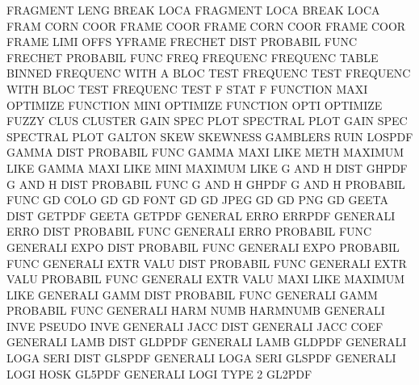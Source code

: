FRAGMENT LENG                           BREAK    LOCA
FRAGMENT LOCA                           BREAK    LOCA
FRAM     CORN COOR                      FRAME    COOR
FRAME    CORN COOR                      FRAME    COOR
FRAME    LIMI OFFS                      YFRAME
FRECHET  DIST                           PROBABIL FUNC
FRECHET                                 PROBABIL FUNC
FREQ                                    FREQUENC
FREQUENC TABLE                          BINNED
FREQUENC WITH A    BLOC TEST            FREQUENC TEST
FREQUENC WITH BLOC TEST                 FREQUENC TEST
F        STAT                           F
FUNCTION MAXI                           OPTIMIZE
FUNCTION MINI                           OPTIMIZE
FUNCTION OPTI                           OPTIMIZE
FUZZY    CLUS                           CLUSTER
GAIN     SPEC PLOT                      SPECTRAL PLOT
GAIN     SPEC                           SPECTRAL PLOT
GALTON   SKEW                           SKEWNESS
GAMBLERS RUIN                           LOSPDF
GAMMA    DIST                           PROBABIL FUNC
GAMMA    MAXI LIKE METH                 MAXIMUM  LIKE
GAMMA    MAXI LIKE MINI                 MAXIMUM  LIKE
G        AND  H    DIST                 GHPDF
G        AND  H    DIST                 PROBABIL FUNC
G        AND  H                         GHPDF
G        AND  H                         PROBABIL FUNC
GD       COLO                           GD
GD       FONT                           GD
GD       JPEG                           GD
GD       PNG                            GD
GEETA    DIST                           GETPDF
GEETA                                   GETPDF
GENERAL  ERRO                           ERRPDF
GENERALI ERRO DIST                      PROBABIL FUNC
GENERALI ERRO                           PROBABIL FUNC
GENERALI EXPO DIST                      PROBABIL FUNC
GENERALI EXPO                           PROBABIL FUNC
GENERALI EXTR VALU DIST                 PROBABIL FUNC
GENERALI EXTR VALU                      PROBABIL FUNC
GENERALI EXTR VALU MAXI LIKE            MAXIMUM  LIKE
GENERALI GAMM DIST                      PROBABIL FUNC
GENERALI GAMM                           PROBABIL FUNC
GENERALI HARM NUMB                      HARMNUMB
GENERALI INVE                           PSEUDO   INVE
GENERALI JACC DIST                      GENERALI JACC COEF
GENERALI LAMB DIST                      GLDPDF
GENERALI LAMB                           GLDPDF
GENERALI LOGA SERI DIST                 GLSPDF
GENERALI LOGA SERI                      GLSPDF
GENERALI LOGI HOSK                      GL5PDF
GENERALI LOGI TYPE 2                    GL2PDF
